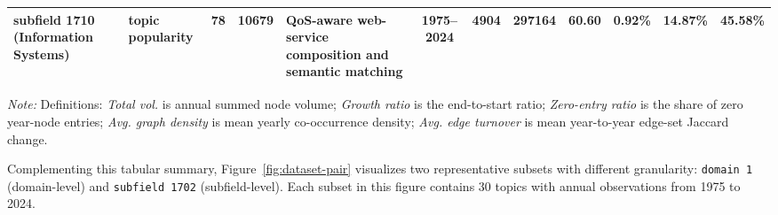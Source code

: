 \documentclass[runningheads]{llncs}
\begin{document}
\begin{table}[htbp]
{\begin{tabular}{>{\centering\arraybackslash}m{2.35cm}>{\centering\arraybackslash}m{1.45cm}c c >{\raggedright\arraybackslash}m{3.20cm}c c c c c c c}
subfield 1710 (Information Systems) & topic popularity & 78 & 10679 & QoS-aware web-service composition and semantic matching & 1975--2024 & 4904 & 297164 & 60.60 & 0.92\% & 14.87\% & 45.58\% \\
\bottomrule
\end{tabular}%
}
\endgroup
\vspace{2pt}
{\raggedright\footnotesize\textit{Note:} Definitions: \textit{Total vol.} is annual summed node volume; \textit{Growth ratio} is the end-to-start ratio; \textit{Zero-entry ratio} is the share of zero year-node entries; \textit{Avg. graph density} is mean yearly co-occurrence density; \textit{Avg. edge turnover} is mean year-to-year edge-set Jaccard change.\par}
\end{table}

Complementing this tabular summary, Figure~\ref{fig:dataset-pair} visualizes two representative subsets with different granularity: \texttt{domain 1} (domain-level) and \texttt{subfield 1702} (subfield-level). Each subset in this figure contains 30 topics with annual observations from 1975 to 2024.
\end{document}
